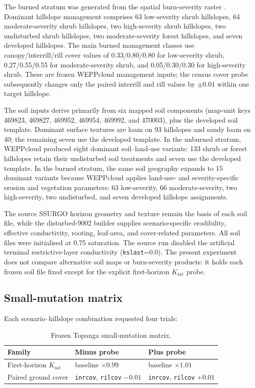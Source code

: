 \documentclass[11pt]{article}
\newcommand{\Ksat}{\ensuremath{K_{\mathrm{sat}}}}
\begin{document}
The burned stratum was generated from the spatial burn-severity raster
. Dominant hillslope management comprises
63 low-severity shrub hillslopes, 64 moderate-severity shrub hillslopes, two
high-severity shrub hillslopes, two undisturbed shrub hillslopes, two
moderate-severity forest hillslopes, and seven developed hillslopes. The main
burned management classes use canopy/interrill/rill cover values of
0.33/0.80/0.80 for low-severity shrub, 0.27/0.55/0.55 for moderate-severity
shrub, and 0.05/0.30/0.30 for high-severity shrub. These are frozen WEPPcloud
management inputs; the census cover probe subsequently changes only the paired
interrill and rill values by \(\pm0.01\) within one target hillslope.

The soil inputs derive primarily from six mapped soil components (map-unit
keys 469823, 469827, 469952, 469954, 469992, and 470003), plus the developed
soil template. Dominant surface textures are loam on 93 hillslopes and sandy
loam on 40; the remaining seven use the developed template. In the unburned
stratum, WEPPcloud produced eight dominant soil--land-use variants: 133 shrub
or forest hillslopes retain their undisturbed soil treatments and seven use the
developed template. In the burned stratum, the same soil geography expands to
15 dominant variants because WEPPcloud applies land-use- and severity-specific
erosion and vegetation parameters: 63 low-severity, 66 moderate-severity, two
high-severity, two undisturbed, and seven developed hillslope assignments.

The source SSURGO horizon geometry and texture remain the basis of each soil
file, while the disturbed-9002 builder supplies scenario-specific erodibility,
effective conductivity, rooting, leaf-area, and cover-related parameters. All
soil files were initialised at 0.75 saturation. The source run disabled the
artificial terminal restrictive-layer conductivity (\texttt{kslast}=0.0).
The present experiment does not compare alternative soil maps or burn-severity
products: it holds each frozen soil file fixed except for the explicit
first-horizon \Ksat{} probe.

\subsection{Small-mutation matrix}

Each scenario--hillslope combination requested four trials:

\begin{table}[H]
  \centering
  \caption{Frozen Topanga small-mutation matrix.}
  \label{tab:mutations}
  \begin{tabular}{lll}
    \toprule
    Family & Minus probe & Plus probe \\
    \midrule
    First-horizon \Ksat{} & baseline $\times 0.99$ & baseline $\times 1.01$ \\
    Paired ground cover & \texttt{inrcov}, \texttt{rilcov} $-0.01$ &
      \texttt{inrcov}, \texttt{rilcov} $+0.01$ \\
    \bottomrule
  \end{tabular}
\end{table}
\end{document}
